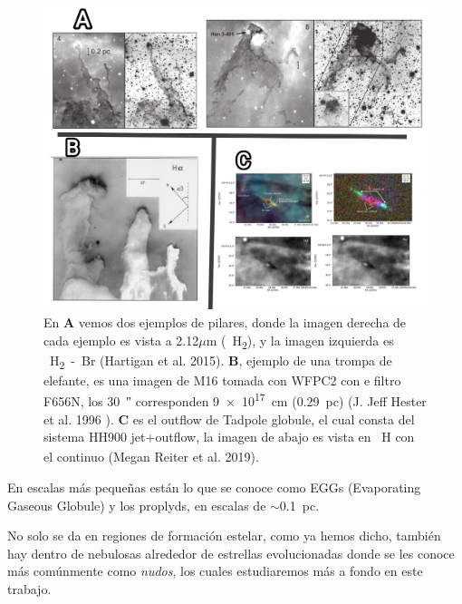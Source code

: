 \documentclass{article}
\begin{document}
\begin{figure}[h]
    \centering
    \includegraphics[width=1 \textwidth]{images Chapter 1/C1_Pillars.jpg}
    \caption{En \textbf{A} vemos dos ejemplos de pilares, donde la imagen derecha de cada ejemplo es vista a 2.12$\mu$m (\SI{}{H_2}), y la imagen izquierda es \SI{}{H_2-Br_{\gamma}} (Hartigan et al. 2015). \textbf{B}, ejemplo de una trompa de elefante, es una imagen de M16 tomada con WFPC2 con e filtro F656N, los \SI{30}{\arcsecond} corresponden \SI{9e17}{cm} (\SI{.29}{pc}) (J. Jeff Hester et al. 1996 ). \textbf{C} es el outflow de Tadpole globule, el cual consta del sistema HH900 jet+outflow, la imagen de abajo es vista en \SI{}{H_\alpha} con el continuo 
    (Megan Reiter et al. 2019). }
    \label{fig:zones}
\end{figure}

En escalas más pequeñas están lo que se conoce como EGGs (Evaporating Gaseous Globule) y los proplyds, en escalas de $\sim$\SI{0.1}{pc}. 

No solo se da en regiones de formación estelar, como ya hemos dicho, también hay dentro de nebulosas alrededor de estrellas evolucionadas donde se les conoce más comúnmente como \textit{nudos}, los cuales estudiaremos más a fondo en este trabajo.
\end{document}

